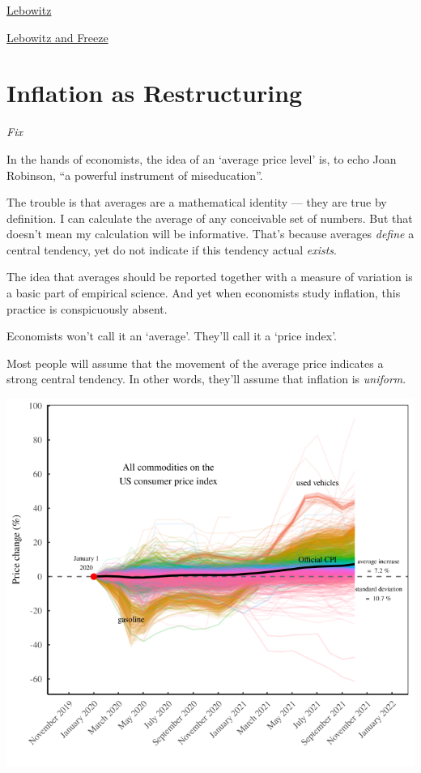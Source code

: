 \documentclass[
]{book}
\begin{document}
\href{https://www.seeitmarket.com/is-inflation-coming-in-2021-watch-money-supply-and-velocity/}{Lebowitz}

\href{https://realinvestmentadvice.com/stoking-the-embers-of-inflation/}{Lebowitz and Freeze}

\hypertarget{inflation-as-restructuring}{%
\section{Inflation as Restructuring}\label{inflation-as-restructuring}}

\emph{Fix}

In the hands of economists, the idea of an `average price level' is, to echo Joan Robinson, ``a powerful instrument of miseducation''.

The trouble is that averages are a mathematical identity --- they are true by definition. I can calculate the average of any conceivable set of numbers. But that doesn't mean my calculation will be informative. That's because averages \emph{define} a central tendency, yet do not indicate if this tendency actual \emph{exists}.

The idea that averages should be reported together with a measure of variation is a basic part of empirical science. And yet when economists study inflation, this practice is conspicuously absent.

Economists won't call it an `average'. They'll call it a `price index'.

Most people will assume that the movement of the average price indicates a strong central tendency. In other words, they'll assume that inflation is \emph{uniform}.

\includegraphics{fig/inflation_2020_all.png}
\end{document}
